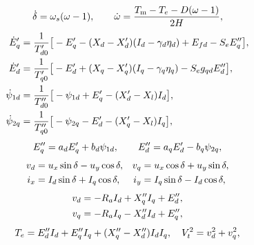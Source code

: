 \documentclass[journal,onecolumn]{IEEEtran}
\begin{document}
\begin{equation}\label{eq:app_gen_swing}
\dot{\delta}=\omega_s(\omega-1), \qquad
\dot{\omega}=\frac{T_{\mathrm{m}}-T_e-D(\omega-1)}{2H},
\end{equation}
\begin{equation}\label{eq:app_gen_emf}
\begin{aligned}
\dot{E}'_q&=\frac{1}{T'_{d0}}\big[-E'_q-(X_d-X'_d)(I_d-\gamma_d\eta_d)+E_{fd}-S_e E''_q\big],\\
\dot{E}'_d&=\frac{1}{T'_{q0}}\big[-E'_d+(X_q-X'_q)(I_q-\gamma_q\eta_q)-S_e g_{qd} E''_d\big],\\
\dot{\psi}_{1d}&=\frac{1}{T''_{d0}}\big[-\psi_{1d}+E'_q-(X'_d-X_l)I_d\big],\\
\dot{\psi}_{2q}&=\frac{1}{T''_{q0}}\big[-\psi_{2q}-E'_d-(X'_q-X_l)I_q\big],
\end{aligned}
\end{equation}
\begin{equation}\label{eq:app_gen_emfpp}
E''_q=a_d E'_q+b_d\psi_{1d}, \qquad E''_d=a_q E'_d-b_q\psi_{2q},
\end{equation}
\begin{equation}\label{eq:app_gen_park}
\begin{aligned}
v_d&=u_x\sin\delta-u_y\cos\delta, & v_q&=u_x\cos\delta+u_y\sin\delta,\\
i_x&=I_d\sin\delta+I_q\cos\delta, & i_y&=I_q\sin\delta-I_d\cos\delta,\\
\end{aligned}
\end{equation}
\begin{equation}\label{eq:app_gen_stator}
\begin{aligned}
v_d&=-R_a I_d+X''_q I_q+E''_d,\\
v_q&=-R_a I_q-X''_d I_d+E''_q,\\
\end{aligned}
\end{equation}
\begin{equation}\label{eq:app_gen_te}
T_e=E''_d I_d+E''_q I_q+(X''_q-X''_d)I_d I_q, \quad V_t^2=v_d^2+v_q^2,
\end{equation}
\end{document}
